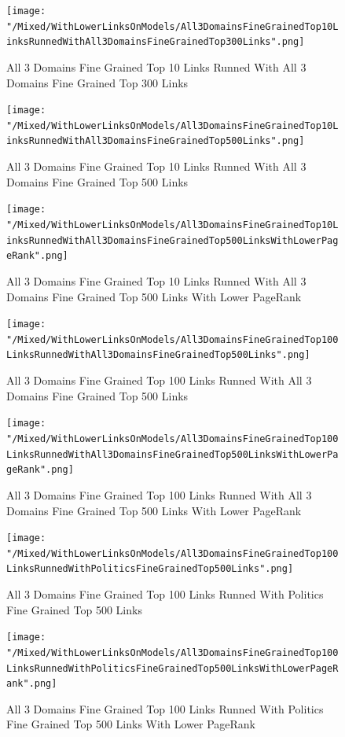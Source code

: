 \documentclass[thesis=M,english]{FITthesis}[2018/05/30]
\begin{document}
	\begin{figure}[H]\centering
		\texttt{[image: "/Mixed/WithLowerLinksOnModels/All3DomainsFineGrainedTop10LinksRunnedWithAll3DomainsFineGrainedTop300Links".png]}
		\caption{All 3 Domains Fine Grained Top 10 Links Runned With All 3 Domains Fine Grained Top 300 Links}\label{}
	\end{figure}
	
	\begin{figure}[H]\centering
		\texttt{[image: "/Mixed/WithLowerLinksOnModels/All3DomainsFineGrainedTop10LinksRunnedWithAll3DomainsFineGrainedTop500Links".png]}
		\caption{All 3 Domains Fine Grained Top 10 Links Runned With All 3 Domains Fine Grained Top 500 Links}\label{}
	\end{figure}
	
	\begin{figure}[H]\centering
		\texttt{[image: "/Mixed/WithLowerLinksOnModels/All3DomainsFineGrainedTop10LinksRunnedWithAll3DomainsFineGrainedTop500LinksWithLowerPageRank".png]}
		\caption{All 3 Domains Fine Grained Top 10 Links Runned With All 3 Domains Fine Grained Top 500 Links With Lower PageRank}\label{}
	\end{figure}
	
	\begin{figure}[H]\centering
		\texttt{[image: "/Mixed/WithLowerLinksOnModels/All3DomainsFineGrainedTop100LinksRunnedWithAll3DomainsFineGrainedTop500Links".png]}
		\caption{All 3 Domains Fine Grained Top 100 Links Runned With All 3 Domains Fine Grained Top 500 Links}\label{}
	\end{figure}
	
	\begin{figure}[H]\centering
		\texttt{[image: "/Mixed/WithLowerLinksOnModels/All3DomainsFineGrainedTop100LinksRunnedWithAll3DomainsFineGrainedTop500LinksWithLowerPageRank".png]}
		\caption{All 3 Domains Fine Grained Top 100 Links Runned With All 3 Domains Fine Grained Top 500 Links With Lower PageRank}\label{}
	\end{figure}
	
	\begin{figure}[H]\centering
		\texttt{[image: "/Mixed/WithLowerLinksOnModels/All3DomainsFineGrainedTop100LinksRunnedWithPoliticsFineGrainedTop500Links".png]}
		\caption{All 3 Domains Fine Grained Top 100 Links Runned With Politics Fine Grained Top 500 Links}\label{}
	\end{figure}
	
	\begin{figure}[H]\centering
		\texttt{[image: "/Mixed/WithLowerLinksOnModels/All3DomainsFineGrainedTop100LinksRunnedWithPoliticsFineGrainedTop500LinksWithLowerPageRank".png]}
		\caption{All 3 Domains Fine Grained Top 100 Links Runned With Politics Fine Grained Top 500 Links With Lower PageRank}\label{}
	\end{figure}
	
\end{document}

